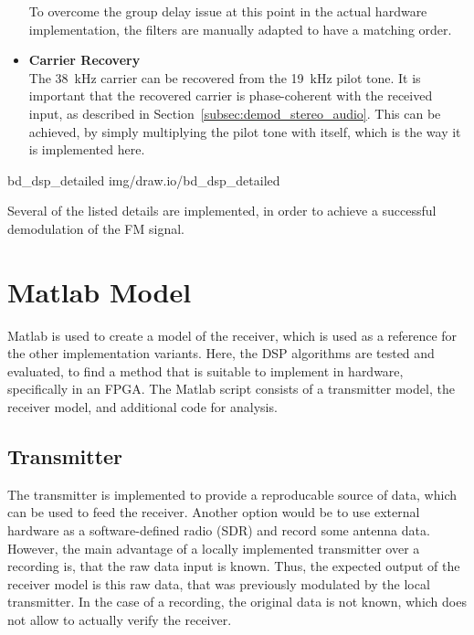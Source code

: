 \begin{itemize}
      To overcome the group delay issue at this point in the actual hardware implementation, the filters are manually adapted to have a matching order.\\
  \item \textbf{Carrier Recovery}\\
      The 38~kHz carrier can be recovered from the 19~kHz pilot tone.
      It is important that the recovered carrier is phase-coherent with the received input, as described in Section~\ref{subsec:demod_stereo_audio}.
      This can be achieved, by simply multiplying the pilot tone with itself, which is the way it is implemented here.\\
\end{itemize}

 {bd_dsp_detailed} {img/draw.io/bd_dsp_detailed}

\noindent
Several of the listed details are implemented, in order to achieve a successful demodulation of the FM signal.

\section{Matlab Model}

Matlab is used to create a model of the receiver, which is used as a reference for the other implementation variants.
Here, the DSP algorithms are tested and evaluated, to find a method that is suitable to implement in hardware, specifically in an FPGA.
The Matlab script consists of a transmitter model, the receiver model, and additional code for analysis.

\subsection{Transmitter}

The transmitter is implemented to provide a reproducable source of data, which can be used to feed the receiver.
Another option would be to use external hardware as a software-defined radio (SDR) and record some antenna data.
However, the main advantage of a locally implemented transmitter over a recording is, that the raw data input is known.
Thus, the expected output of the receiver model is this raw data, that was previously modulated by the local transmitter.
In the case of a recording, the original data is not known, which does not allow to actually verify the receiver.\\

